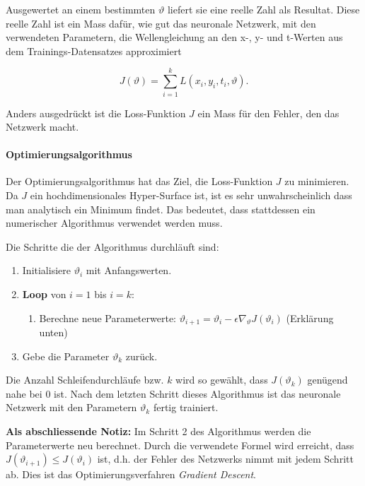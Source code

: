 Ausgewertet an einem bestimmten \( \vartheta \) liefert sie eine reelle Zahl als Resultat.
Diese reelle Zahl ist ein Mass dafür, wie gut das neuronale Netzwerk, mit den verwendeten Parametern, die Wellengleichung an den x-, y- und t-Werten aus dem Trainings-Datensatzes approximiert

\begin{equation}
    J(\vartheta) = \sum_{i=1}^{k} L(x_i, y_i, t_i, \vartheta).
    \label{neuronal:loss}
\end{equation}

Anders ausgedrückt ist die Loss-Funktion \( J \) ein Mass für den Fehler, den das Netzwerk macht.

\paragraph{Optimierungsalgorithmus}

Der Optimierungsalgorithmus hat das Ziel, die Loss-Funktion \( J \) zu minimieren.
Da \( J \) ein hochdimensionales Hyper-Surface ist, ist es sehr unwahrscheinlich dass man analytisch ein Minimum findet.
Das bedeutet, dass stattdessen ein numerischer Algorithmus verwendet werden muss.

\begin{tcolorbox}[colback=gray!10, colframe=black, boxrule=0.5pt]
    Die Schritte die der Algorithmus durchläuft sind:
    \begin{enumerate}
        \item Initialisiere \( \vartheta_i \) mit Anfangswerten.
        \item \textbf{Loop} von \( i = 1 \) bis \( i = k \):
        \begin{enumerate}
            \item Berechne neue Parameterwerte: \( \vartheta_{i+1} = \vartheta_i - \epsilon \nabla_\vartheta J\left(\vartheta_i\right) \) (Erklärung unten)
        \end{enumerate}
        \item Gebe die Parameter \( \vartheta_k \) zurück.
    \end{enumerate}
\end{tcolorbox}

Die Anzahl Schleifendurchläufe bzw. \( k \) wird so gewählt, dass \( J(\vartheta_k) \) genügend nahe bei 0 ist.
Nach dem letzten Schritt dieses Algorithmus ist das neuronale Netzwerk mit den Parametern \( \vartheta_k \) fertig trainiert.

\textbf{Als abschliessende Notiz:} Im Schritt 2 des Algorithmus werden die Parameterwerte neu berechnet.
Durch die verwendete Formel wird erreicht, dass \( J(\vartheta_{i+1}) \leq J(\vartheta_i) \) ist, d.h. der Fehler des Netzwerks nimmt mit jedem Schritt ab.
Dies ist das Optimierungsverfahren \emph{Gradient Descent}.


